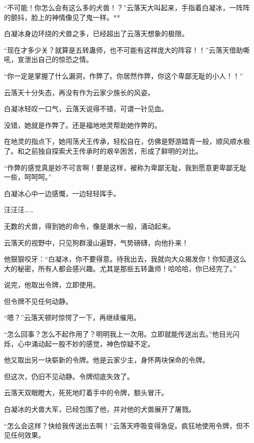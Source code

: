 
\begin{this_body}

“不可能！你怎么会有这么多的犬兽！？”云落天大叫起来，手指着白凝冰，一阵阵的颤抖，脸上的神情像见了鬼一样。**

白凝冰身边环绕的犬兽之多，已经超出了云落天想象的极限。

“现在才多少关？就算是五转蛊师，也不可能有这样庞大的阵容！！”云落天借助嘶吼，宣泄出自己的惊恐之情。

“你一定是掌握了什么漏洞，作弊了。你居然作弊，你这个卑鄙无耻的小人！！”

云落天十分失态，再没有作为云家少族长的风姿。

白凝冰轻叹一口气，云落天说得不错，可谓一针见血。

没错，她就是作弊了。还是福地地灵帮助她作弊的。

在地灵的指点下，她闯荡犬王传承，轻松自在，仿佛是野游踏青一般，顺风顺水极了。和之前独自探索犬王传承时的艰辛困苦，形成了鲜明的对比。

“作弊的感觉真是妙不可言啊！要是这样，被称为卑鄙无耻，我到愿意更卑鄙无耻一些，呵呵呵。”

白凝冰心中一边感慨，一边轻轻挥手。

汪汪汪……

无数的犬兽，得到她的命令，像是潮水一般，涌动起来。

云落天的视野中，只见狗群漫山遍野，气势磅礴，向他扑来！

他狠狠咬牙：“白凝冰，你不要得意。待我出去，我就向大众揭发你！你知道这么大的秘密，所有人都会感兴趣。尤其是那些五转蛊师！哈哈哈，你已经完了。”

说完，他取出令牌，立即使用。

但令牌不见任何动静。

“嗯？”云落天顿时惊愕了一下，再继续催用。

“怎么回事？怎么不起作用了？明明我上一次用。立即就能传送出去。”他目光闪烁，心中涌动起一股不妙的感觉，神色惊疑不定。

他又取出另一块崭新的令牌。他是云家少主，身怀两块保命的令牌。

但这次，仍旧不见动静。令牌彻底失效了。

云落天双眼瞪大，死死地盯着手中的令牌，额头冒汗。

白凝冰的犬兽大军，已经包围了他，并对他的犬兽展开了屠戮。

“怎么会这样？快给我传送出去啊！”云落天呼吸变得急促。疯狂地使用令牌，但不见任何效果。


\end{this_body}
